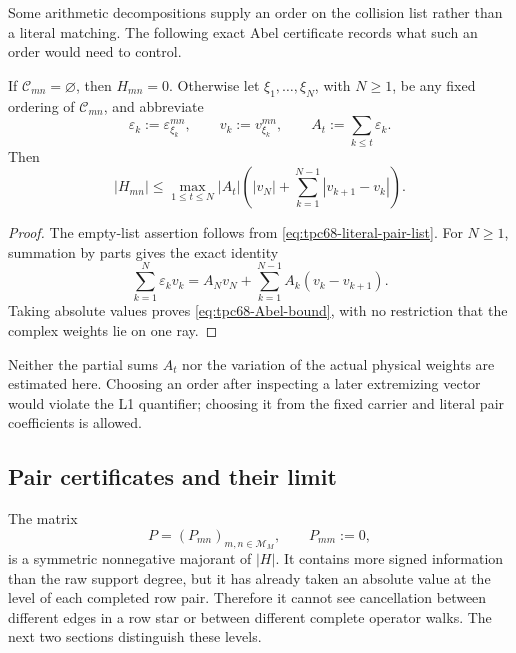 Some arithmetic decompositions supply an order on the collision list
rather than a literal matching.  The following exact Abel certificate
records what such an order would need to control.

\begin{proposition}
\label{prop:tpc68-Abel-certificate}
If \(\mathcal C_{mn}=\varnothing\), then \(H_{mn}=0\).  Otherwise let
\(\xi_1,\ldots,\xi_N\), with \(N\ge1\), be any fixed ordering of
\(\mathcal C_{mn}\), and abbreviate
\[
 \varepsilon_k:=\varepsilon_{\xi_k}^{mn},
 \qquad v_k:=v_{\xi_k}^{mn},
 \qquad A_t:=\sum_{k\le t}\varepsilon_k.
\]
Then
\begin{equation}
 |H_{mn}|
 \le
 \max_{1\le t\le N}|A_t|
 \left(
 |v_N|+\sum_{k=1}^{N-1}|v_{k+1}-v_k|
 \right).
 \label{eq:tpc68-Abel-bound}
\end{equation}
\end{proposition}

\begin{proof}
The empty-list assertion follows from
\eqref{eq:tpc68-literal-pair-list}.  For \(N\ge1\), summation by parts
gives the exact identity
\[
 \sum_{k=1}^{N}\varepsilon_kv_k
 =A_Nv_N+\sum_{k=1}^{N-1}A_k(v_k-v_{k+1}).
\]
Taking absolute values proves \eqref{eq:tpc68-Abel-bound}, with no
restriction that the complex weights lie on one ray.
\end{proof}

Neither the partial sums \(A_t\) nor the variation of the actual physical
weights are estimated here.  Choosing an order after inspecting a later
extremizing vector would violate the L1 quantifier; choosing it from the
fixed carrier and literal pair coefficients is allowed.

\subsection{Pair certificates and their limit}

The matrix
\[
 P=(P_{mn})_{m,n\in\mathcal M_M},
\qquad P_{mm}:=0,
\]
is a symmetric nonnegative majorant of \(|H|\).  It contains more signed
information than the raw support degree, but it has already taken an
absolute value at the level of each completed row pair.  Therefore it
cannot see cancellation between different edges in a row star or between
different complete operator walks.  The next two sections distinguish
these levels.

